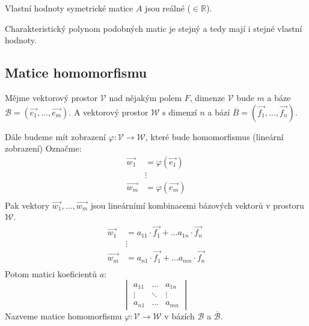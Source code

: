 \begin{theorem}
    Vlastní hodnoty symetrické matice $A$ jsou reálné ($\in \mathbb{R}$).
\end{theorem}

\begin{theorem}
    Charakteristický polynom podobných matic je stejný a tedy mají i stejné vlastní hodnoty.
\end{theorem}

\subsection{Matice homomorfismu}
\begin{definition}
    Mějme vektorový prostor $\mathcal{V}$ nad nějakým polem $F$, dimenze $\mathcal{V}$ bude
    $m$ a báze $\mathcal{B} = (\vec{e_1}, \ldots, \vec{e_m})$. A vektorový prostor $\mathcal{W}$
    s dimenzí $n$ a bází $\overline{B} = (\vec{f_1}, \ldots, \vec{f_n})$.

    Dále budeme mít zobrazení $\varphi: \mathcal{V} \rightarrow \mathcal{W}$, které bude homomorfismus
    (lineární zobrazení)
    Označme:
    \begin{align*}
        \vec{w_1} &= \varphi(\vec{e_1})\\
        &\vdots\\
        \vec{w_m} &= \varphi(\vec{e_m})\\
    \end{align*}
    Pak vektory $\vec{w_1}, \ldots, \vec{w_m}$ jsou lineárnímí kombinacemi bázových vektorů v prostoru
    $\mathcal{W}$.
    \begin{align*}
        \vec{w_1} &= a_{11} \cdot \vec{f_1} + \ldots a_{1n} \cdot \vec{f_n}\\
        &\vdots\\
        \vec{w_m} &= a_{n1} \cdot \vec{f_1} + \ldots a_{mn} \cdot \vec{f_n}\\
    \end{align*}
    Potom matici koeficientů $a$:
    \[
        \begin{vmatrix}
            a_{11} & \ldots & a_{1n} \\
            \vdots & \ddots & \vdots\\
            a_{n1} & \ldots & a_{mn}
        \end{vmatrix}
    \]
    Nazveme matice homomorfismu $\varphi: \mathcal{V} \rightarrow \mathcal{W}$ v bázích $\mathcal{B}$
    a $\overline{\mathcal{B}}$.
\end{definition}


